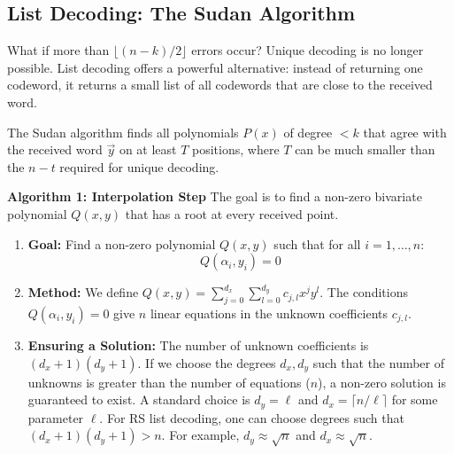 \subsection{List Decoding: The Sudan Algorithm}

What if more than $\lfloor (n-k)/2 \rfloor$ errors occur? Unique decoding is no longer possible. List decoding offers a powerful alternative: instead of returning one codeword, it returns a small list of all codewords that are close to the received word.

The Sudan algorithm finds all polynomials $P(x)$ of degree $<k$ that agree with the received word $\vec{y}$ on at least $T$ positions, where $T$ can be much smaller than the $n-t$ required for unique decoding.

\textbf{Algorithm 1: Interpolation Step}
The goal is to find a non-zero bivariate polynomial $Q(x,y)$ that has a root at every received point.
\begin{enumerate}
    \item \textbf{Goal:} Find a non-zero polynomial $Q(x,y)$ such that for all $i=1, \dots, n$:
    \[ Q(\alpha_i, y_i) = 0 \]
    \item \textbf{Method:} We define $Q(x,y) = \sum_{j=0}^{d_x} \sum_{l=0}^{d_y} c_{j,l} x^j y^l$. The conditions $Q(\alpha_i, y_i) = 0$ give $n$ linear equations in the unknown coefficients $c_{j,l}$.
    \item \textbf{Ensuring a Solution:} The number of unknown coefficients is $(d_x+1)(d_y+1)$. If we choose the degrees $d_x, d_y$ such that the number of unknowns is greater than the number of equations ($n$), a non-zero solution is guaranteed to exist. A standard choice is $d_y = \ell$ and $d_x = \lceil n/\ell \rceil$ for some parameter $\ell$. For RS list decoding, one can choose degrees such that $(d_x+1)(d_y+1) > n$. For example, $d_y \approx \sqrt{n}$ and $d_x \approx \sqrt{n}$.
\end{enumerate}

